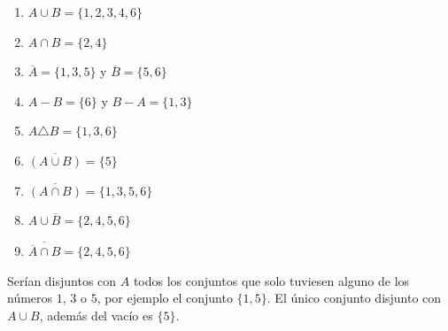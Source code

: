 \documentclass[
  spanish,
  a4paper,
]{scrreport}
\providecommand{\tightlist}{%
  \setlength{\itemsep}{0pt}\setlength{\parskip}{0pt}}
\theoremstyle{definition}
\theoremstyle{remark}
\begin{document}
\begin{tcolorbox}[enhanced jigsaw, arc=.35mm, bottomrule=.15mm, bottomtitle=1mm, breakable, colback=white, colbacktitle=quarto-callout-tip-color!10!white, colframe=quarto-callout-tip-color-frame, coltitle=black, left=2mm, leftrule=.75mm, opacityback=0, opacitybacktitle=0.6, rightrule=.15mm, title=\textcolor{quarto-callout-tip-color}{\faLightbulb}\hspace{0.5em}{Solución}, titlerule=0mm, toprule=.15mm, toptitle=1mm]

\begin{enumerate}
\def\labelenumi{\alph{enumi}.}
\tightlist
\item
  \(A\cup B = \{1, 2, 3, 4, 6\}\)
\item
  \(A\cap B = \{2, 4\}\)
\item
  \(\overline A = \{1, 3, 5\}\) y \(\overline B = \{5, 6\}\)
\item
  \(A-B = \{6\}\) y \(B-A = \{1,3\}\)
\item
  \(A\triangle B = \{1, 3, 6\}\)
\item
  \(\overline{(A\cup B)} = \{5\}\)
\item
  \(\overline{(A\cap B)} = \{1,3, 5, 6\}\)
\item
  \(A\cup \overline B = \{2, 4, 5, 6\}\)
\item
  \(\overline{\overline A \cap B} = \{2, 4, 5, 6\}\)
\end{enumerate}

Serían disjuntos con \(A\) todos los conjuntos que solo tuviesen alguno
de los números \(1\), \(3\) o \(5\), por ejemplo el conjunto
\(\{1, 5\}\). El único conjunto disjunto con \(A\cup B\), además del
vacío es \(\{5\}\).

\end{tcolorbox}
\end{document}
